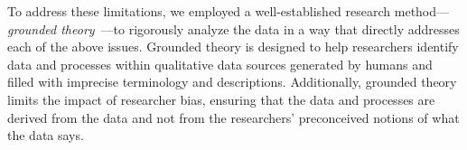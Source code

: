 To address these limitations, we employed a well-established research 
method---\emph{grounded 
theory}~\cite{corbin1990grounded,wolfswinkel2013using}---to rigorously analyze 
the data in a way that directly addresses each of the above issues.
Grounded theory is designed to help researchers identify data and processes 
within qualitative data sources generated by humans and filled with imprecise 
terminology and descriptions.
Additionally, grounded theory limits the impact of researcher bias, ensuring that the data and processes are derived from the data and not from the researchers' preconceived notions of what the data says.






